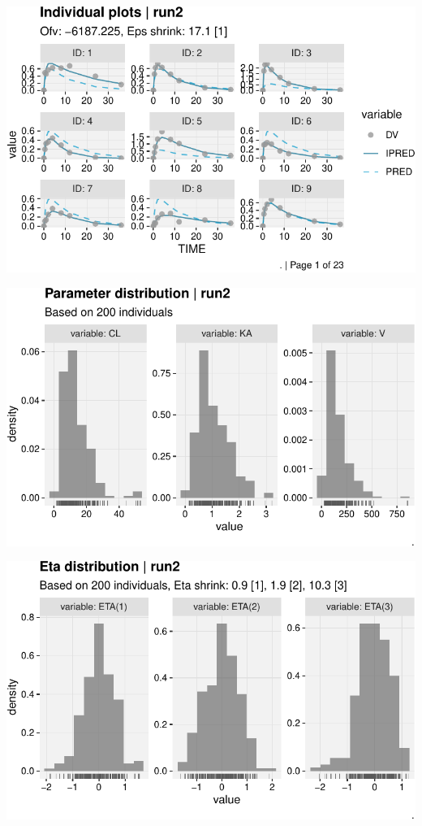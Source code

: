 \documentclass[
  letterpaper,
  toc=chapterentrywithdots,
  11pt,
  headings=small]{scrreprt}
\begin{document}
\includegraphics{sec/results_files/figure-pdf/unnamed-chunk-4-11.pdf}

\includegraphics{sec/results_files/figure-pdf/unnamed-chunk-4-12.pdf}

\includegraphics{sec/results_files/figure-pdf/unnamed-chunk-4-13.pdf}
\end{document}
